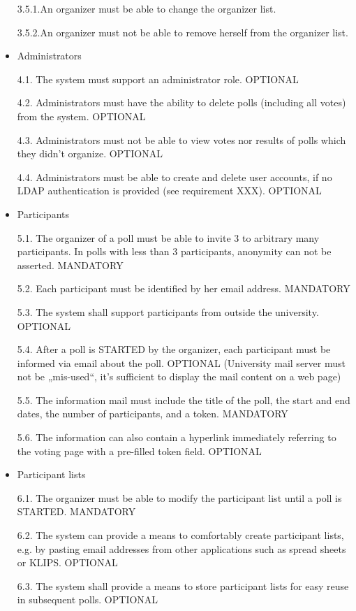 \begin{itemize}
3.5.1.An organizer must be able to change the organizer list.


3.5.2.An organizer must not be able to remove herself from the organizer list.


\item Administrators


4.1. The system must support an administrator role. OPTIONAL


4.2. Administrators must have the ability to delete polls (including all votes) from the system. OPTIONAL


4.3. Administrators must not be able to view votes nor results of polls which they didn’t organize.
OPTIONAL


4.4. Administrators must be able to create and delete user accounts, if no LDAP authentication is
provided (see requirement XXX). OPTIONAL


\item Participants


5.1. The organizer of a poll must be able to invite 3 to arbitrary many participants. In polls with
less than 3 participants, anonymity can not be asserted. MANDATORY


5.2. Each participant must be identified by her email address. MANDATORY


5.3. The system shall support participants from outside the university. OPTIONAL


5.4. After a poll is STARTED by the organizer, each participant must be informed via email about
the poll. OPTIONAL (University mail server must not be „mis-used“, it’s sufficient to display
the mail content on a web page)


5.5. The information mail must include the title of the poll, the start and end dates, the number of
participants, and a token. MANDATORY


5.6. The information can also contain a hyperlink immediately referring to the voting page with a
pre-filled token field. OPTIONAL


\item Participant lists


6.1. The organizer must be able to modify the participant list until a poll is STARTED. MANDATORY


6.2. The system can provide a means to comfortably create participant lists, e.g. by pasting
email addresses from other applications such as spread sheets or KLIPS. OPTIONAL


6.3. The system shall provide a means to store participant lists for easy reuse in subsequent
polls. OPTIONAL



\end{itemize}
